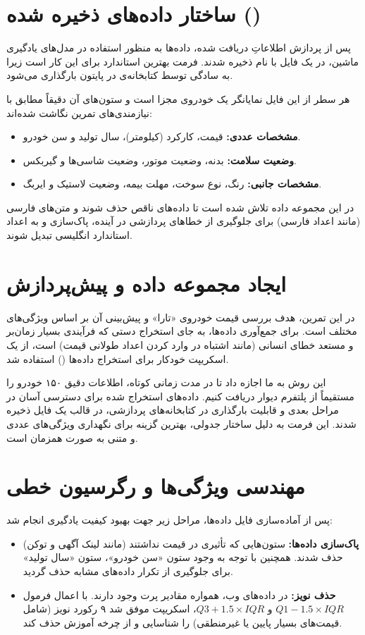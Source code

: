 \documentclass[12pt, a4paper]{article}
\begin{document}
	\section{ساختار داده‌های ذخیره شده ()}
	پس از پردازش اطلاعاتِ دریافت شده، داده‌ها به منظور استفاده در مدل‌های یادگیری ماشین، در یک فایل  با نام  ذخیره شدند. فرمت  بهترین استاندارد برای این کار است زیرا به سادگی توسط کتابخانه‌ی  در پایتون بارگذاری می‌شود.
	
	هر سطر از این فایل نمایانگر یک خودروی مجزا است و ستون‌های آن دقیقاً مطابق با نیازمندی‌های تمرین نگاشت شده‌اند:
	\begin{itemize}
		\item \textbf{مشخصات عددی:} قیمت، کارکرد (کیلومتر)، سال تولید و سن خودرو.
		\item \textbf{وضعیت سلامت:} بدنه، وضعیت موتور، وضعیت شاسی‌ها و گیربکس.
		\item \textbf{مشخصات جانبی:} رنگ، نوع سوخت، مهلت بیمه، وضعیت لاستیک و ایربگ.
	\end{itemize}
	در این مجموعه داده تلاش شده است تا داده‌های ناقص حذف شوند و متن‌های فارسی (مانند اعداد فارسی) برای جلوگیری از خطاهای پردازشی در آینده، پاک‌سازی و به اعداد استاندارد انگلیسی تبدیل شوند.

\section{ایجاد مجموعه داده و پیش‌پردازش}
در این تمرین، هدف بررسی قیمت خودروی «تارا» و پیش‌بینی آن بر اساس ویژگی‌های مختلف است. برای جمع‌آوری داده‌ها، به جای استخراج دستی که فرآیندی بسیار زمان‌بر و مستعد خطای انسانی (مانند اشتباه در وارد کردن اعداد طولانی قیمت) است، از یک اسکریپت خودکار برای استخراج داده‌ها () استفاده شد. 

این روش به ما اجازه داد تا در مدت زمانی کوتاه، اطلاعات دقیق ۱۵۰ خودرو را مستقیماً از پلتفرم دیوار دریافت کنیم. داده‌های استخراج شده برای دسترسی آسان در مراحل بعدی و قابلیت بارگذاری در کتابخانه‌های پردازشی، در قالب یک فایل  ذخیره شدند. این فرمت به دلیل ساختار جدولی، بهترین گزینه برای نگهداری ویژگی‌های عددی و متنی به صورت همزمان است.

\section{مهندسی ویژگی‌ها و رگرسیون خطی}
پس از آماده‌سازی فایل داده‌ها، مراحل زیر جهت بهبود کیفیت یادگیری انجام شد:

\begin{itemize}
	\item \textbf{پاک‌سازی داده‌ها:} ستون‌هایی که تأثیری در قیمت نداشتند (مانند لینک آگهی و توکن) حذف شدند. همچنین با توجه به وجود ستون «سن خودرو»، ستون «سال تولید» برای جلوگیری از تکرار داده‌های مشابه حذف گردید.
	\item \textbf{حذف نویز:} در داده‌های وب، همواره مقادیر پرت وجود دارند. با اعمال فرمول $Q1 - 1.5 \times IQR$ و $Q3 + 1.5 \times IQR$، اسکریپت موفق شد ۹ رکورد نویز (شامل قیمت‌های بسیار پایین یا غیرمنطقی) را شناسایی و از چرخه آموزش حذف کند.
\end{itemize}
\end{document}
